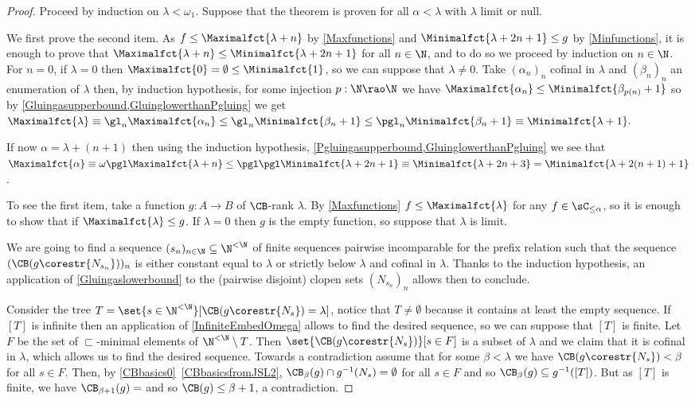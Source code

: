 \begin{proof}
Proceed by induction on $\lambda<\omega_1$. Suppose that the theorem is proven for all $\alpha<\lambda$ with $\lambda$ limit or null.

\smallskip

We first prove the second item. As $f\leq\Maximalfct{\lambda+n}$ by \cref{Maxfunctions} and $\Minimalfct{\lambda+2n+1}\leq g$ by \cref{Minfunctions}, it is enough to prove that
$\Maximalfct{\lambda+n}\leq \Minimalfct{\lambda+2n+1}$ for all $n\in\N$, and to do so we proceed by induction on $n\in\N$.
For $n=0$, if $\lambda=0$ then $\Maximalfct{0}=\emptyset\leq\Minimalfct{1}$, so we can suppose that $\lambda\neq0$.
Take $(\alpha_n)_n$ cofinal in $\lambda$ and $(\beta_n)_n$ an enumeration of $\lambda$ then, by induction hypothesis, for some injection $p:\N\rao\N$ we have
$\Maximalfct{\alpha_n}\leq\Minimalfct{\beta_{p(n)}+1}$ so by \cref{Gluingasupperbound,GluinglowerthanPgluing} we get
\(\Maximalfct{\lambda}\equiv\gl_n\Maximalfct{\alpha_n}\leq\gl_n\Minimalfct{\beta_n+1}\leq\pgl_n\Minimalfct{\beta_n+1}\equiv\Minimalfct{\lambda+1}.\)

If now $\alpha=\lambda+(n+1)$ then using the induction hypothesis, \cref{Pgluingasupperbound,GluinglowerthanPgluing} we see that
$\Maximalfct{\alpha}\equiv\omega\pgl\Maximalfct{\lambda+n}\leq\pgl\pgl\Minimalfct{\lambda+2n+1}\equiv\Minimalfct{\lambda+2n+3}= \Minimalfct{\lambda+2(n+1)+1}$.

\smallskip

To see the first item, take a function $g:A\to B$ of $\CB$-rank $\lambda$. By \cref{Maxfunctions} $f\leq\Maximalfct{\lambda}$ for any $f\in \sC_{\leq \alpha}$, so it is enough to show that if $\Maximalfct{\lambda}\leq g$.
If $\lambda=0$ then $g$ is the empty function, so suppose that $\lambda$ is limit. 

We are going to find a sequence $(s_n)_{n\in\N}\subseteq\N^{<\N}$ of finite sequences pairwise incomparable for the prefix relation such that the sequence $(\CB(g\corestr{N_{s_n}}))_n$
is either constant equal to $\lambda$ or strictly below $\lambda$ and cofinal in $\lambda$. Thanks to the induction hypothesis, an application of \cref{Gluingaslowerbound}
to the (pairwise disjoint) clopen sets $(N_{s_n})_n$ allows then to conclude.

Consider the tree $T=\set{s\in\N^{<\N}}[\CB(g\corestr{N_s})=\lambda]$, notice that $T\neq\emptyset$ because it contains at least the empty sequence.
If $[T]$ is infinite then an application of \cref{InfiniteEmbedOmega} allows to find the desired sequence, so we can suppose that $[T]$ is finite.
Let $F$ be the set of $\sqsubset$-minimal elements of $\N^{<\N}\setminus T$. Then $\set{\CB(g\corestr{N_s})}[ s\in F]$ is a subset of $\lambda$ and we claim that it is cofinal in $\lambda$, which allows us to find the desired sequence. Towards a contradiction assume that for some $\beta<\lambda$ we have $\CB(g\corestr{N_s})<\beta$ for all $s\in F$. Then, by \cref{CBbasics0}~\cref{CBbasicsfromJSL2},  $\CB_{\beta}(g)\cap g^{-1}(N_s)=\emptyset$ for all $s\in F$ and so $\CB_{\beta}(g)\subseteq g^{-1}([T])$. But as $[T]$ is finite, we have $\CB_{\beta+1}(g)=\empty$ and so $\CB(g)\leq \beta+1$, a contradiction.
\end{proof}

